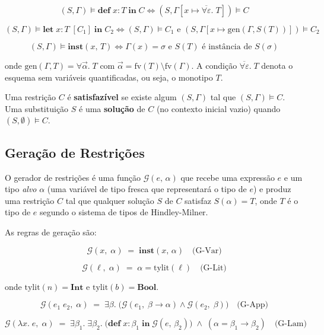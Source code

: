   \[ (S, \Gamma) \models \mathbf{def}\; x : T\; \mathbf{in}\; C \iff (S,
  \Gamma[x \mapsto \overline{\forall \varepsilon}.\; T]) \models C \]

  \[ (S, \Gamma) \models \mathbf{let}\; x : T\; [C_1]\; \mathbf{in}\; C_2
    \iff (S, \Gamma) \models C_1 \text{ e } (S, \Gamma[x \mapsto
  \mathrm{gen}(\Gamma, S(T))]) \models C_2 \]

  \[ (S, \Gamma) \models \mathbf{inst}(x,\, T) \iff \Gamma(x) = \sigma \text{ e
  } S(T) \text{ é instância de } S(\sigma) \]

  onde \(\mathrm{gen}(\Gamma, T) = \forall \vec{\alpha}.\; T\) com
  \(\vec{\alpha} = \mathrm{fv}(T) \setminus \mathrm{fv}(\Gamma)\). A
  condição \(\overline{\forall \varepsilon}.\; T\) denota o esquema sem
  variáveis quantificadas, ou seja, o monotipo \(T\).

  Uma restrição \(C\) é \textbf{satisfazível} se existe algum \((S,
  \Gamma)\) tal que \((S, \Gamma) \models C\). Uma substituição \(S\) é
  uma \textbf{solução} de \(C\) (no contexto inicial vazio) quando
  \((S, \emptyset) \models C\).

  \subsection{Geração de Restrições}

  O gerador de restrições é uma função \(\mathcal{G}(e,\, \alpha)\) que
  recebe uma expressão \(e\) e um tipo \emph{alvo} \(\alpha\) (uma
  variável de tipo fresca que representará o tipo de \(e\)) e produz
  uma restrição \(C\) tal que qualquer solução \(S\) de \(C\) satisfaz
  \(S(\alpha) = T\), onde \(T\) é o tipo de \(e\) segundo o sistema de
  tipos de Hindley-Milner.

  As regras de geração são:

  \[ \mathcal{G}(x,\; \alpha) \;=\; \mathbf{inst}(x,\, \alpha)
  \quad\text{(G-Var)} \]

  \[ \mathcal{G}(\ell,\; \alpha) \;=\; \alpha = \mathrm{tylit}(\ell)
  \quad\text{(G-Lit)} \]

  onde \(\mathrm{tylit}(n) = \mathbf{Int}\) e
  \(\mathrm{tylit}(b) = \mathbf{Bool}\).

  \[ \mathcal{G}(e_1\; e_2,\; \alpha) \;=\; \exists
    \beta.\;\bigl(\mathcal{G}(e_1,\; \beta \to \alpha) \wedge \mathcal{G}(e_2,\;
  \beta)\bigr) \quad\text{(G-App)} \]

  \[ \mathcal{G}(\lambda x.\; e,\; \alpha) \;=\; \exists \beta_1.\; \exists
    \beta_2.\; \bigl(\mathbf{def}\; x : \beta_1\; \mathbf{in}\;
    \mathcal{G}(e,\, \beta_2)\bigr) \;\wedge\; (\alpha = \beta_1 \to \beta_2)
  \quad\text{(G-Lam)} \]

